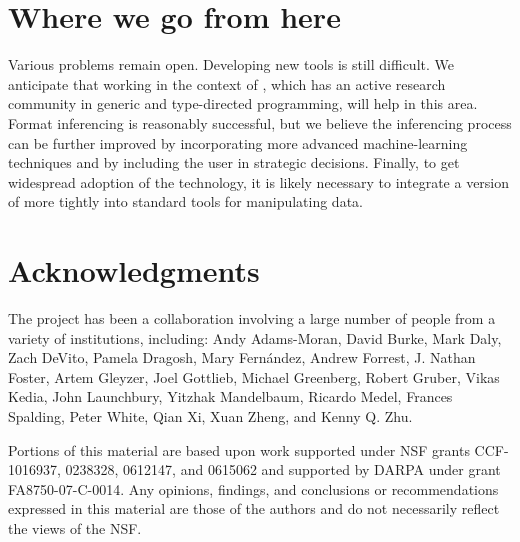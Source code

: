 \documentclass{sig-alternate}
\begin{document}
\section{Where we go from here}
\label{sec:conclusion}
Various problems remain open.  
Developing new tools is still difficult.  We anticipate that working
in the context of \haskell{}, which has an active research community
in generic and type-directed programming, will help in this area.  
Format inferencing is reasonably successful, but we believe the
inferencing process can be further improved by incorporating more
advanced machine-learning techniques and by including the user in
strategic decisions.  Finally, to get widespread adoption of the
technology, it is likely necessary to integrate a version of \pads{}
more tightly into standard tools for manipulating data. 

  \newpage

\section*{Acknowledgments}
The \pads{} project has been a collaboration involving a large number of
people from a variety of institutions, including:
Andy Adams-Moran,
David Burke,
Mark Daly,
Zach DeVito,
Pamela Dragosh,
Mary Fern\'andez,
Andrew Forrest,
J. Nathan Foster,
Artem Gleyzer,
Joel Gottlieb,
Michael Greenberg,
Robert Gruber,
Vikas Kedia,
John Launchbury,
Yitzhak Mandelbaum,
Ricardo Medel,
Frances Spalding,
Peter White,
Qian Xi,
Xuan Zheng, and
Kenny Q. Zhu.

Portions of this material are based upon work 
supported under NSF grants CCF-1016937,  0238328,  0612147, and 0615062 and
supported by DARPA under grant FA8750-07-C-0014.
Any opinions, findings, and conclusions or recommendations
   expressed in this material are those of the authors and do not
   necessarily reflect the views of the NSF.


%


\end{document}
